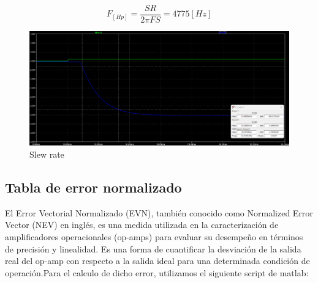 \documentclass[12pt]{article}
\begin{document}
	\begin{equation}
		F_[Hp]=\frac{SR}{2\pi FS} = 4775[Hz]
	\end{equation} 
	
	\begin{figure}[h!]
		\includegraphics[width=\linewidth]{Imagenes_simulaciones/Sim_slow_rate}
		\caption[Slew rate]{Slew rate}
		\label{fig:simslowrate}
	\end{figure}
	
	\subsection{Tabla de error normalizado}
	El Error Vectorial Normalizado (EVN), también conocido como Normalized Error Vector (NEV) en inglés, es una medida utilizada en la caracterización de amplificadores operacionales (op-amps) para evaluar su desempeño en términos de precisión y linealidad. Es una forma de cuantificar la desviación de la salida real del op-amp con respecto a la salida ideal para una determinada condición de operación.Para el calculo de dicho error, utilizamos el siguiente script de matlab:
	
\end{document}
